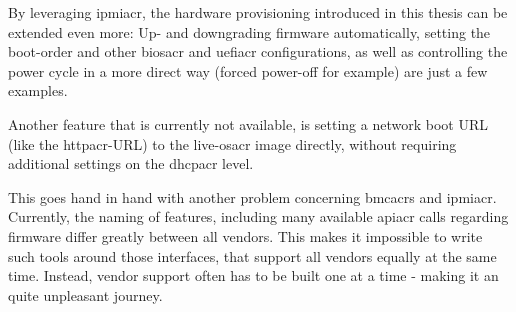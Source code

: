 By leveraging \gls{ipmiacr}, the hardware provisioning introduced in this thesis can be extended even more: Up- and downgrading firmware automatically, setting the boot-order and other \gls{biosacr} and \gls{uefiacr} configurations, as well as controlling the power cycle in a more direct way (forced power-off for example) are just a few examples. 

Another feature that is currently not available, is setting a network boot URL (like the \gls{httpacr}-URL) to the live-\gls{osacr} image directly, without requiring additional settings on the \gls{dhcpacr} level.

This goes hand in hand with another problem concerning \gls{bmcacr}s and \gls{ipmiacr}. Currently, the naming of features, including many available \gls{apiacr} calls regarding firmware differ greatly between all vendors. This makes it impossible to write such tools around those interfaces, that support all vendors equally at the same time. Instead, vendor support often has to be built one at a time - making it an quite unpleasant journey.




